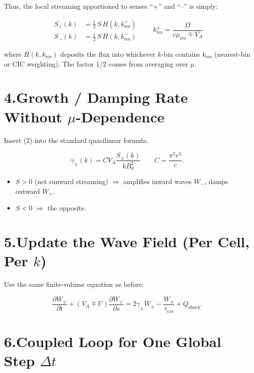 Thus, the local streaming apportioned to senses ``+'' and ``--'' is simply:

\[
\boxed{
\begin{aligned}
S_{+}(k) &= \frac{1}{2} \, S \, H(k, k_{\text{res}}^{+}) \\
S_{-}(k) &= \frac{1}{2} \, S \, H(k, k_{\text{res}}^{-})
\end{aligned}
}
\qquad
k_{\text{res}}^{\pm} = \frac{\Omega}{v \mu_{\text{res}} \mp V_A}
\tag{2}
\]

where $H(k, k_{\text{res}})$ deposits the flux into whichever $k$-bin contains $k_{\text{res}}$ (nearest-bin or CIC weighting). The factor $1/2$ comes from averaging over $\mu$.

\section*{4.\quad Growth / Damping Rate Without $\mu$-Dependence}

Insert (2) into the standard quasilinear formula:

\[
\boxed{ \gamma_\pm(k) = C V_A \frac{S_\pm(k)}{k B_0^{2}} }
\qquad
C = \frac{\pi^{2} e^{2}}{c}.
\tag{3}
\]

\begin{itemize}
\item $S > 0$ (net sunward streaming) $\Rightarrow$ amplifies inward waves $W_{-}$, damps outward $W_{+}$.
\item $S < 0$ $\Rightarrow$ the opposite.
\end{itemize}

\section*{5.\quad Update the Wave Field (Per Cell, Per $k$)}

Use the same finite-volume equation as before:

\[
\frac{\partial W_\pm}{\partial t} + (V_A \mp U) \frac{\partial W_\pm}{\partial s}
= 2 \gamma_\pm W_\pm - \frac{W_\pm}{\tau_{\text{cas}}} + Q_{\text{shock}}.
\tag{4}
\]

\section*{6.\quad Coupled Loop for One Global Step $\Delta t$}

